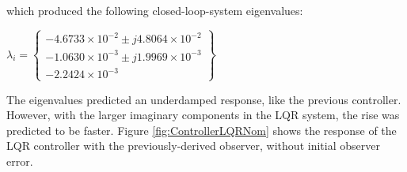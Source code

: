 \documentclass[]{aiaa-tc}%
\begin{document}
	\vspace{5 mm}
\noindent
which produced the following closed-loop-system eigenvalues:

	\vspace{5 mm}

{\centering
 $\lambda_i=\begin{Bmatrix}-4.6733\times10^{-2} \pm j4.8064\times10^{-2}\\
-1.0630\times10^{-3} \pm j1.9969\times10^{-3}\\
-2.2424\times10^{-3}
\end{Bmatrix}$\par
}

	\vspace{5 mm}

The eigenvalues predicted an underdamped response, like the previous controller. However, with the larger imaginary components in the LQR system, the rise was predicted to be faster.  Figure \ref{fig:ControllerLQRNom} shows the response of the LQR controller with the previously-derived observer, without initial observer error.
\end{document}

